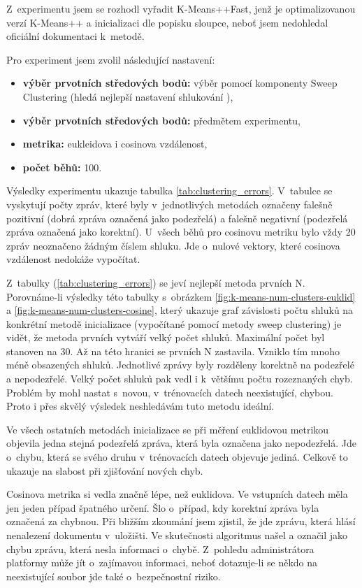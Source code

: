 \documentclass[thesis=M,czech]{FITthesis}[2012/10/20]
\begin{document}
		Z~experimentu jsem se rozhodl vyřadit K-Means++Fast, jenž je optimalizovanou verzí K-Means++ a inicializaci dle popisku sloupce, neboť jsem nedohledal oficiální dokumentaci k~metodě.
		
		Pro experiment jsem zvolil následující nastavení:
		
		\begin{itemize} 
			\item \textbf{výběr prvotních středových bodů: } výběr pomocí komponenty Sweep Clustering (hledá nejlepší nastavení shlukování \cite{sweep-clustering}),
			\item \textbf{výběr prvotních středových bodů: } předmětem experimentu,
			\item \textbf{metrika: } eukleidova i cosinova vzdálenost,
			\item \textbf{počet běhů: } 100.	
		\end{itemize}
		
		Výsledky experimentu ukazuje tabulka \ref{tab:clustering_errors}. V~tabulce se vyskytují počty zpráv, které byly v~jednotlivých metodách označeny falešně pozitivní (dobrá zpráva označená jako podezřelá) a falešně negativní (podezřelá zpráva označená jako korektní). U~všech běhů pro cosinovu metriku bylo vždy 20 zpráv neoznačeno žádným číslem shluku. Jde o~nulové vektory, které cosinova vzdálenost nedokáže vypočítat.
		
		Z~tabulky (\ref{tab:clustering_errors}) se jeví nejlepší metoda prvních N. Porovnáme-li výsledky této tabulky s~obrázkem \ref{fig:k-means-num-clusters-euklid} a \ref{fig:k-means-num-clusters-cosine}, který ukazuje graf závislosti počtu shluků na konkrétní metodě inicializace (vypočítané pomocí metody sweep clustering) je vidět, že metoda prvních vytváří velký počet shluků. Maximální počet byl stanoven na 30. Až na této hranici se prvních N zastavila. Vzniklo tím mnoho méně obsazených shluků. Jednotlivé zprávy byly rozděleny korektně na podezřelé a nepodezřelé. Velký počet shluků pak vedl i k~většímu počtu rozeznaných chyb. Problém by mohl nastat s~novou, v~trénovacích datech neexistující, chybou. Proto i přes skvělý výsledek neshledávám tuto metodu ideální.
		
		Ve všech ostatních metodách inicializace se při měření euklidovou metrikou objevila jedna stejná podezřelá zpráva, která byla označena jako nepodezřelá. Jde o~chybu, která se svého druhu v~trénovacích datech objevuje jediná. Celkově to ukazuje na slabost při zjišťování nových chyb.
		
		Cosinova metrika si vedla značně lépe, než euklidova. Ve vstupních datech měla jen jeden případ špatného určení. Šlo o~případ, kdy korektní zpráva byla označená za chybnou. Při bližším zkoumání jsem zjistil, že jde zprávu, která hlásí nenalezení dokumentu v~uložišti. Ve skutečnosti algoritmus našel a označil jako chybu zprávu, která nesla informaci o~chybě. Z~pohledu administrátora platformy může jít o~zajímavou informaci, neboť dotazuje-li se někdo na neexistující soubor jde také o~bezpečnostní riziko.
		
\end{document}
